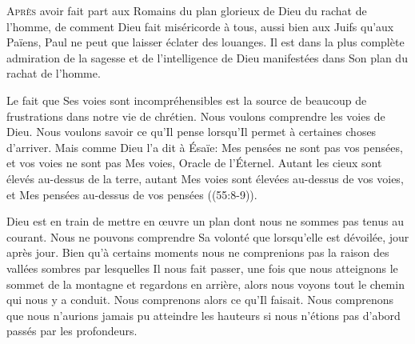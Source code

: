 



\lettrine{A}{près} avoir fait part aux Romains
 du plan glorieux de Dieu du rachat de l'homme,
 de comment Dieu fait miséricorde à tous,
 aussi bien aux Juifs qu'aux Païens,
 Paul ne peut que laisser éclater des louanges.
 Il est dans la plus complète admiration de la sagesse
 et de l'intelligence de Dieu manifestées
 dans Son plan du rachat de l'homme.


Le fait que \Og Ses voies sont incompréhensibles \Fg{}
 est la source de beaucoup de frustrations dans notre vie de chrétien. 
 Nous voulons comprendre les voies de Dieu. Nous voulons savoir ce qu'Il pense
 lorsqu'Il permet à certaines choses d'arriver.
 Mais comme Dieu l'a dit à Ésaïe: 
 \Og Mes pensées ne sont pas vos pensées, et vos voies ne sont pas Mes voies,
 \ocadr Oracle de l'Éternel. Autant les cieux sont élevés au-dessus
 de la terre, autant Mes voies sont élevées au-dessus de vos voies,
 et Mes pensées au-dessus de vos pensées \Fg{}
 ((55:8-9)).

Dieu est en train de mettre en \oe{}uvre un plan dont nous ne sommes
 pas tenus au courant. Nous ne pouvons comprendre Sa volonté
 que lorsqu'elle est dévoilée, jour après jour.
 Bien qu'à certains moments nous ne comprenions pas la raison
 des vallées sombres par lesquelles Il nous fait passer,
 une fois que nous atteignons le sommet de la montagne
 et regardons en arrière, alors nous voyons tout le chemin
 qui nous y a conduit. Nous comprenons alors ce qu'Il faisait.
 Nous comprenons que nous n'aurions jamais pu atteindre
 les hauteurs si nous n'étions pas d'abord passés par les profondeurs.

\dvrule



